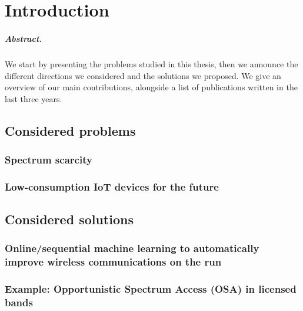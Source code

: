 
\chapter{Introduction}
\label{chapter:1}
\minitoc

\paragraph{Abstract.}
We start by presenting the problems studied in this thesis,
then we announce the different directions we considered and the solutions we proposed.
We give an overview of our main contributions, alongside a list of publications written in the last three years.

\newpage
\graphicspath{{2-Chapters/1-Chapter/Images/}}

\section{Considered problems}
\label{sec:1:problems}


\subsection{Spectrum scarcity}


\subsection{Low-consumption IoT devices for the future}


\section{Considered solutions}
\label{sec:1:solutions}



\subsection{Online/sequential machine learning to automatically improve wireless communications on the run}

\subsection{Example: Opportunistic Spectrum Access (OSA) in licensed bands}

